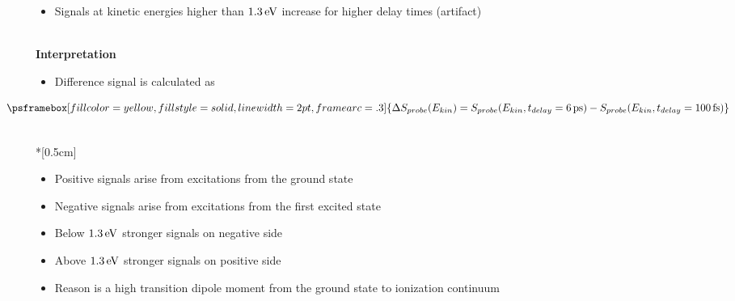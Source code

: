 \documentclass[12pt]{article}
\begin{document}
{\begin{minipage}[c][27cm]{19cm}
\begin{minipage}[!t]{17.5cm}
\begin{itemize}
\item Signals at kinetic energies higher than $\unit[1.3]{eV}$ increase for higher delay times (artifact)
\end{itemize}
\end{minipage} \\
{\Large \bf \sf Interpretation } \\
\begin{minipage}[t]{18.5cm}
\begin{itemize}
\item Difference signal is calculated as \\
\end{itemize}
\begin{displaymath}
\hspace{-1cm}
\psframebox[fillcolor=yellow,fillstyle=solid,linewidth=2pt,framearc=.3]{
\Delta S_{probe} (E_{kin}) = S_{probe} (E_{kin}, t_{delay} = \unit[6]{ps}) - S_{probe} (E_{kin}, t_{delay} = \unit[100]{fs})
}
\end{displaymath}
\end{minipage} \\*[0.5cm]
\begin{minipage}[!t]{9cm}
\begin{center}
\end{center}
\end{minipage}
\begin{minipage}[!t]{9.5cm}
\begin{itemize}
\item Positive signals arise from excitations from the ground state
\item Negative signals arise from excitations from the first excited state
\item Below $\unit[1.3]{eV}$ stronger signals on negative side
\item Above $\unit[1.3]{eV}$ stronger signals on positive side
\item Reason is a high transition dipole moment from the ground state to ionization continuum
\end{itemize}
\end{minipage} \\
\bigskip
\vspace{1cm}
\end{minipage} }
\vspace{3cm}
\end{document}
